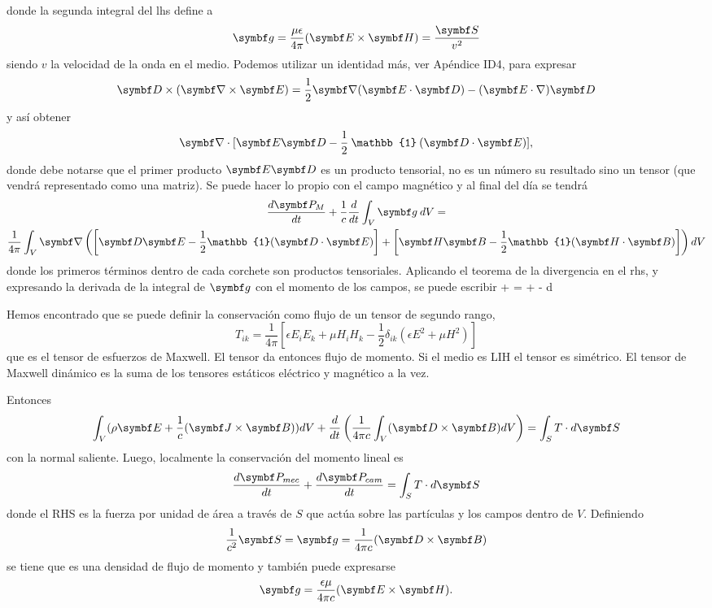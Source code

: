 \documentclass[10pt,oneside]{CBFT_book}
\begin{document}
donde la segunda integral del lhs define a
\[
	\vb{g} = \frac{\mu \epsilon}{4\pi} (\pv{E}{H}) = \frac{\vb{S}}{v^2}
\]
siendo $v$ la velocidad de la onda en el medio.
Podemos utilizar un identidad más, ver Apéndice ID4, para expresar
\[
	\vb{D}\times(\rotorm{E}) = \frac{1}{2} \Nabla(\pe{E}{D}) - (\vb{E}\cdot\nabla)\vb{D}
\]
y así obtener
\[
	\Nabla \cdot[ \vb{E}\vb{D} - \frac{1}{2} \: \mathbb{1} \: (\pe{D}{E}) ],
\]
donde debe notarse que el primer producto $\vb{E}\vb{D}$ es un producto tensorial, no es un
número su resultado sino un tensor (que vendrá representado como una matriz).
Se puede hacer lo propio con el campo magnético y al final del día se tendrá
\begin{multline*}
	\dtot{\vb{P}_M}{t} + \frac{1}{c} \dtot{}{t}\int_V \vb{g} \: dV = \\
	\frac{1}{4\pi} \int_V \Nabla\left( \left[ \vb{D}\vb{E} - 
	\frac{1}{2}\mathbb{1}( \pe{D}{E}) \right] + 
	\left[ \vb{H}\vb{B} - \frac{1}{2}\mathbb{1}(\pe{H}{B}) \right] \right) dV
\end{multline*}
donde los primeros términos dentro de cada corchete son productos tensoriales.
Aplicando el teorema de la divergencia en el rhs, y expresando la derivada de la integral
de $\vb{g}$ con el momento de los campos, se puede escribir
\be
	 +   =
	 \int \:  + 
	-  \:  \left[ \: \pe{D}{E} + \pe{H}{B} \: \right] \: d
\ee


Hemos encontrado que se puede definir la conservación como flujo de un tensor de segundo rango,
\[
	T_{ik} = \frac{1}{4\pi}\left[ \epsilon E_iE_k + \mu H_iH_k - \frac{1}{2}\delta_{ik}
	( \epsilon E^2 + \mu H^2)\right]
\]
que es el tensor de esfuerzos de Maxwell. El tensor da entonces flujo de momento. Si el
medio es LIH el tensor es simétrico.
El tensor de Maxwell dinámico es la suma de los tensores estáticos eléctrico y magnético
a la vez.

Entonces
\[
	\int_V (\rho\vb{E} + \frac{1}{c}(\pv{J}{B}) ) dV + 
	\dtot{}{t}\left( \frac{1}{4\pi c}\int_V (\pv{D}{B})dV\right) = \int_S T \cdot d\vb{S}
\]
con la normal saliente. Luego, localmente la conservación del momento lineal es
\[
	\dtot{\vb{P}_{mec}}{t} + \dtot{\vb{P}_{cam}}{t}  = \int_S T \cdot d\vb{S}
\]
donde el RHS es la fuerza por unidad de área a través de $S$ que actúa sobre las partículas y
los campos dentro de $V$.
Definiendo
\[
	\frac{1}{c^2} \vb{S}=  \vb{g} = \frac{1}{4\pi c}(\pv{D}{B})
\]
se tiene que  es una densidad de flujo de momento y también puede expresarse
\[
	\vb{g} = \frac{\epsilon\mu}{4\pi c}(\pv{E}{H}).
\]
\end{document}
